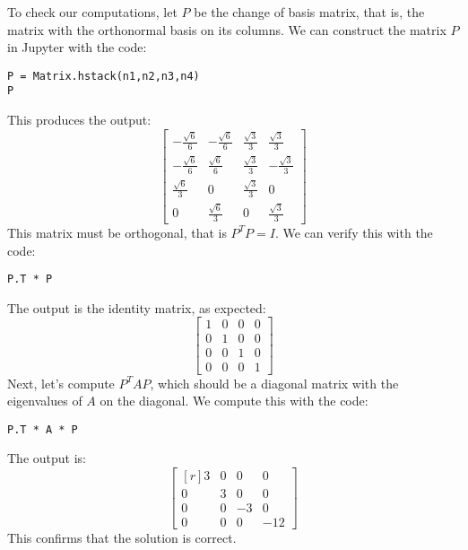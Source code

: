 \documentclass[12pt]{article}
\begin{document}
To check our computations, let $P$ be the change of basis matrix, that is, the matrix with the orthonormal basis on its columns. We can construct the matrix $P$ in Jupyter with the code:
\begin{lstlisting}
P = Matrix.hstack(n1,n2,n3,n4)
P
\end{lstlisting}
This produces the output:
\[
\left[\begin{matrix}- \frac{\sqrt{6}}{6} & - \frac{\sqrt{6}}{6} & \frac{\sqrt{3}}{3} & \frac{\sqrt{3}}{3}\\- \frac{\sqrt{6}}{6} & \frac{\sqrt{6}}{6} & \frac{\sqrt{3}}{3} & - \frac{\sqrt{3}}{3}\\\frac{\sqrt{6}}{3} & 0 & \frac{\sqrt{3}}{3} & 0\\0 & \frac{\sqrt{6}}{3} & 0 & \frac{\sqrt{3}}{3}\end{matrix}\right]
\]
This matrix must be orthogonal, that is $P^TP=I$. We can verify this with the code:
\begin{lstlisting}
P.T * P
\end{lstlisting}
The output is the identity matrix, as expected:
\[
\left[\begin{matrix}1 & 0 & 0 & 0\\0 & 1 & 0 & 0\\0 & 0 & 1 & 0\\0 & 0 & 0 & 1\end{matrix}\right]
\]
Next, let's compute $P^TAP$, which should be a diagonal matrix with the eigenvalues of $A$ on the diagonal. We compute this with the code:
\begin{lstlisting}
P.T * A * P
\end{lstlisting}
The output is:
\[
\left[\begin{matrix*}[r]3 & 0 & 0 & 0\\0 & 3 & 0 & 0\\0 & 0 & -3 & 0\\0 & 0 & 0 & -12\end{matrix*}\right]
\]
This confirms that the solution is correct.
\proofend
\end{document}
